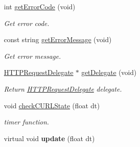 \begin{DoxyCompactItemize}
\mbox{\label{classHTTPRequest_af45a381569bb7d9ce4d0875ec8bfc338}} 
int \hyperlink{classHTTPRequest_af45a381569bb7d9ce4d0875ec8bfc338}{get\+Error\+Code} (void)
\begin{DoxyCompactList}\small\item\em Get error code. \end{DoxyCompactList}\item 
\mbox{\label{classHTTPRequest_a12080984070fb4976be97901d26509ae}} 
const string \hyperlink{classHTTPRequest_a12080984070fb4976be97901d26509ae}{get\+Error\+Message} (void)
\begin{DoxyCompactList}\small\item\em Get error message. \end{DoxyCompactList}\item 
\mbox{\label{classHTTPRequest_a02efdb75ecb1eb90ac5c74e4cdcfd011}} 
\hyperlink{classHTTPRequestDelegate}{H\+T\+T\+P\+Request\+Delegate} $\ast$ \hyperlink{classHTTPRequest_a02efdb75ecb1eb90ac5c74e4cdcfd011}{get\+Delegate} (void)
\begin{DoxyCompactList}\small\item\em Return \hyperlink{classHTTPRequestDelegate}{H\+T\+T\+P\+Request\+Delegate} delegate. \end{DoxyCompactList}\item 
\mbox{\label{classHTTPRequest_a9c400b1c64eade8afa5f16feb5bd9eec}} 
void \hyperlink{classHTTPRequest_a9c400b1c64eade8afa5f16feb5bd9eec}{check\+C\+U\+R\+L\+State} (float dt)
\begin{DoxyCompactList}\small\item\em timer function. \end{DoxyCompactList}\item 
\mbox{\label{classHTTPRequest_a5fa829f81f47974ce236c218af9440a6}} 
virtual void {\bfseries update} (float dt)
\end{DoxyCompactItemize}

